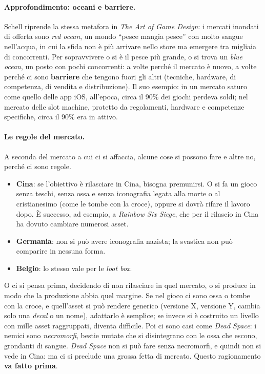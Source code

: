 \paragraph{Approfondimento: oceani e barriere.} Schell riprende la stessa
metafora in \emph{The Art of Game Design}: i mercati inondati di offerta sono
\emph{red ocean}, un mondo ``pesce mangia pesce'' con molto sangue
nell'acqua, in cui la sfida non è più arrivare nello store ma emergere tra
migliaia di concorrenti. Per sopravvivere o si è il pesce più grande, o si
trova un \emph{blue ocean}, un posto con pochi concorrenti: a volte perché il
mercato è nuovo, a volte perché ci sono \textbf{barriere} che tengono fuori
gli altri (tecniche, hardware, di competenza, di vendita e distribuzione). Il
suo esempio: in un mercato saturo come quello delle app iOS, all'epoca, circa
il 90\% dei giochi perdeva soldi; nel mercato delle slot machine, protetto da
regolamenti, hardware e competenze specifiche, circa il 90\% era in attivo.

\paragraph{Le regole del mercato.} A seconda del mercato a cui ci si affaccia,
alcune cose si possono fare e altre no, perché ci sono regole.
\begin{itemize}
  \item \textbf{Cina}: se l'obiettivo è rilasciare in Cina, bisogna
        premunirsi. O si fa un gioco senza teschi, senza ossa e senza
        iconografia legata alla morte o al cristianesimo (come le tombe con
        la croce), oppure si dovrà rifare il lavoro dopo. È successo, ad
        esempio, a \emph{Rainbow Six Siege}, che per il rilascio in Cina ha
        dovuto cambiare numerosi asset.
  \item \textbf{Germania}: non si può avere iconografia nazista; la svastica
        non può comparire in nessuna forma.
  \item \textbf{Belgio}: lo stesso vale per le \emph{loot box}.
\end{itemize}
O ci si pensa prima, decidendo di non rilasciare in quel mercato, o si
produce in modo che la produzione abbia quel margine. Se nel gioco ci sono
ossa o tombe con la croce, e quell'asset si può rendere generico (versione X,
versione Y, cambia solo una \emph{decal} o un nome), adattarlo è semplice; se
invece si è costruito un livello con mille asset raggruppati, diventa
difficile. Poi ci sono casi come \emph{Dead Space}: i nemici sono
\emph{necromorfi}, bestie mutate che si disintegrano con le ossa che escono,
grondanti di sangue. \emph{Dead Space} non si può fare senza necromorfi, e
quindi non si vede in Cina: ma ci si preclude una grossa fetta di mercato.
Questo ragionamento \textbf{va fatto prima}.


